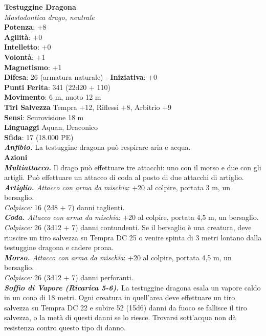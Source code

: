 \begin{multicols}{2}
\medskip\textbf{Testuggine Dragona}\\
\emph{Mastodontica drago, neutrale}\\
\textbf{Potenza}: +8\\
\textbf{Agilità}: +0\\
\textbf{Intelletto}: +0\\
\textbf{Volontà}: +1\\
\textbf{Magnetismo}: +1\\
\textbf{Difesa}: 26 (armatura naturale) - \textbf{Iniziativa}: +0\\
\textbf{Punti Ferita}: 341 (22d20 + 110)\\
\textbf{Movimento}: 6 m, nuoto 12 m\\
\textbf{Tiri Salvezza} Tempra +12, Riflessi +8, Arbitrio +9\\
\textbf{Sensi}: Scurovisione 18 m\\
\textbf{Linguaggi} Aquan, Draconico\\
\textbf{Sfida}: 17 (18.000 PE)\smallskip\\
\emph{\textbf{Anfibio.}} La testuggine dragona può respirare aria e acqua.\\
\smallskip\textbf{Azioni}\\
\emph{\textbf{Multiattacco.}} Il drago può effettuare tre attacchi: uno con il morso e due con gli artigli. Può effettuare un attacco di coda al posto di due attacchi di artiglio.\\
\emph{\textbf{Artiglio.} Attacco con arma da mischia}: +20 al colpire, portata 3 m, un bersaglio.\\
\emph{Colpisce:} 16 (2d8 + 7) danni taglienti. \\
\emph{\textbf{Coda.} Attacco con arma da mischia}: +20 al colpire, portata 4,5 m, un bersaglio.\\
\emph{Colpisce:} 26 (3d12 + 7) danni contundenti. Se il bersaglio è una creatura, deve riuscire un tiro salvezza su Tempra DC  25 o venire spinta di 3 metri lontano dalla testuggine dragona e cadere prona. \\
\emph{\textbf{Morso.} Attacco con arma da mischia}: +20 al colpire, portata 4,5 m, un bersaglio.\\
\emph{Colpisce:} 26 (3d12 + 7) danni perforanti. \\
\emph{\textbf{Soffio di Vapore (Ricarica 5-6).}} La testuggine dragona esala un vapore caldo in un cono di 18 metri. Ogni creatura in quell'area deve effettuare un tiro salvezza su Tempra DC  22 e subire 52 (15d6) danni da fuoco se fallisce il tiro salvezza, o la metà di questi danni se lo riesce. Trovarsi sott'acqua non dà resistenza contro questo tipo di danno.\\

\end{multicols}
